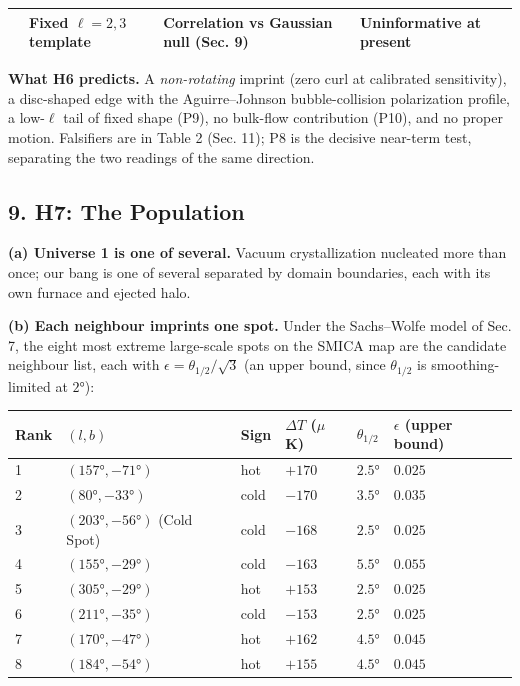 \documentclass[
]{article}
\begin{document}
\begin{longtable}[]{@{}llll@{}}
\begin{minipage}[t]{0.22\columnwidth}
\end{minipage} & \begin{minipage}[t]{0.22\columnwidth}\raggedright
Fixed \(\ell=2,3\) template\strut
\end{minipage} & \begin{minipage}[t]{0.22\columnwidth}\raggedright
Correlation vs Gaussian null (Sec. 9)\strut
\end{minipage} & \begin{minipage}[t]{0.22\columnwidth}\raggedright
Uninformative at present\strut
\end{minipage}\tabularnewline
\bottomrule
\end{longtable}

\textbf{What H6 predicts.} A \emph{non-rotating} imprint (zero curl at
calibrated sensitivity), a disc-shaped edge with the Aguirre--Johnson
bubble-collision polarization profile, a low-\(\ell\) tail of fixed
shape (P9), no bulk-flow contribution (P10), and no proper motion.
Falsifiers are in Table 2 (Sec. 11); P8 is the decisive near-term test,
separating the two readings of the same direction.

\hypertarget{h7-the-population}{%
\subsection{\texorpdfstring{\textbf{9. H7: The
Population}}{9. H7: The Population}}\label{h7-the-population}}

\textbf{(a) Universe 1 is one of several.} Vacuum crystallization
nucleated more than once; our bang is one of several separated by domain
boundaries, each with its own furnace and ejected halo.

\textbf{(b) Each neighbour imprints one spot.} Under the Sachs--Wolfe
model of Sec. 7, the eight most extreme large-scale spots on the SMICA
map are the candidate neighbour list, each with
\(\epsilon = \theta_{1/2}/\sqrt{3}\) (an upper bound, since
\(\theta_{1/2}\) is smoothing-limited at \(2°\)):

\begin{longtable}[]{@{}llllll@{}}
\toprule
Rank & \((l, b)\) & Sign & \(\Delta T\) (\(\mu\)K) & \(\theta_{1/2}\) &
\(\epsilon\) (upper bound)\tabularnewline
\midrule
\endhead
1 & \((157°, -71°)\) & hot & \(+170\) & \(2.5°\) &
\(0.025\)\tabularnewline
2 & \((80°, -33°)\) & cold & \(-170\) & \(3.5°\) &
\(0.035\)\tabularnewline
3 & \((203°, -56°)\) (Cold Spot) & cold & \(-168\) & \(2.5°\) &
\(0.025\)\tabularnewline
4 & \((155°, -29°)\) & cold & \(-163\) & \(5.5°\) &
\(0.055\)\tabularnewline
5 & \((305°, -29°)\) & hot & \(+153\) & \(2.5°\) &
\(0.025\)\tabularnewline
6 & \((211°, -35°)\) & cold & \(-153\) & \(2.5°\) &
\(0.025\)\tabularnewline
7 & \((170°, -47°)\) & hot & \(+162\) & \(4.5°\) &
\(0.045\)\tabularnewline
8 & \((184°, -54°)\) & hot & \(+155\) & \(4.5°\) &
\(0.045\)\tabularnewline
\bottomrule
\end{longtable}
\end{document}

